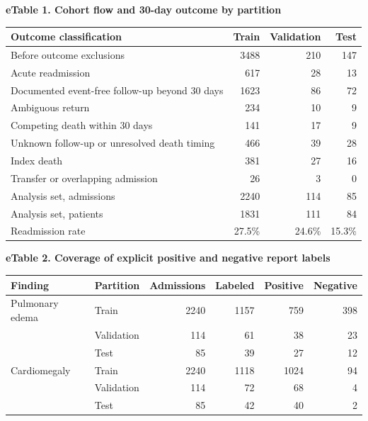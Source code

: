 \begingroup
\small
\setlength{\tabcolsep}{4pt}

\noindent\textbf{eTable 1. Cohort flow and 30-day outcome by partition}\par
\begin{longtable}{@{}p{.59\linewidth}rrr@{}}
\toprule
Outcome classification & Train & Validation & Test \\
\midrule
\endhead
Before outcome exclusions & 3488 & 210 & 147 \\
Acute readmission & 617 & 28 & 13 \\
Documented event-free follow-up beyond 30 days & 1623 & 86 & 72 \\
Ambiguous return & 234 & 10 & 9 \\
Competing death within 30 days & 141 & 17 & 9 \\
Unknown follow-up or unresolved death timing & 466 & 39 & 28 \\
Index death & 381 & 27 & 16 \\
Transfer or overlapping admission & 26 & 3 & 0 \\
\midrule
Analysis set, admissions & 2240 & 114 & 85 \\
Analysis set, patients & 1831 & 111 & 84 \\
Readmission rate & 27.5\% & 24.6\% & 15.3\% \\
\bottomrule
\end{longtable}

\noindent\textbf{eTable 2. Coverage of explicit positive and negative report labels}\par
\begin{longtable}{@{}llrrrr@{}}
\toprule
Finding & Partition & Admissions & Labeled & Positive & Negative \\
\midrule
\endhead
Pulmonary edema & Train & 2240 & 1157 & 759 & 398 \\
 & Validation & 114 & 61 & 38 & 23 \\
 & Test & 85 & 39 & 27 & 12 \\
Cardiomegaly & Train & 2240 & 1118 & 1024 & 94 \\
 & Validation & 114 & 72 & 68 & 4 \\
 & Test & 85 & 42 & 40 & 2 \\
\bottomrule
\end{longtable}

